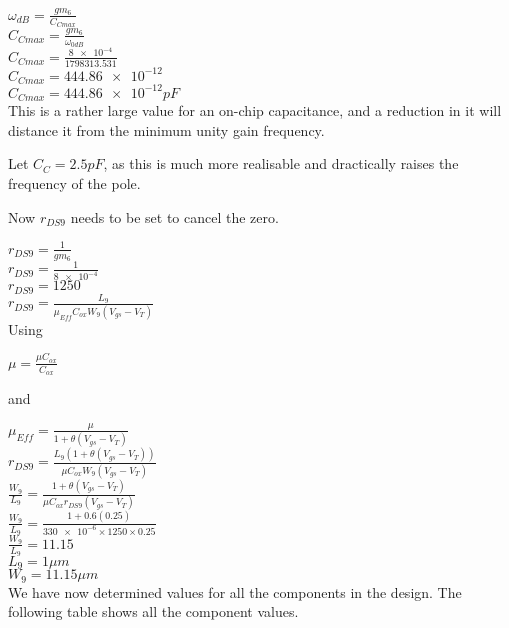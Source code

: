 $\omega_{dB} = \frac{gm_{6}}{C_{Cmax}}$ \\
$C_{Cmax} = \frac{gm_{6}}{\omega_{0dB}}$ \\
$C_{Cmax} = \frac{\num{8e-4}}{1798313.531}$ \\
$C_{Cmax} = \num{444.86e-12}$ \\
$C_{Cmax} = \num{444.86e-12}pF$ \\

This is a rather large value for an on-chip capacitance, and a reduction in it will distance it from the minimum unity gain frequency.

Let $C_{C} = 2.5pF$, as this is much more realisable and dractically raises the frequency of the pole.

Now $r_{DS9}$ needs to be set to cancel the zero.

$r_{DS9} = \frac{1}{gm_{6}}$ \\
$r_{DS9} = \frac{1}{\num{8e-4}}$ \\
$r_{DS9} = 1250$ \\

$r_{DS9} = \frac{L_{9}}{\mu_{Eff}C_{ox}W_{9}(V_{gs} - V_{T})}$ \\

Using

$\mu = \frac{\mu C_{ox}}{C_{ox}}$

and

$\mu_{Eff} = \frac{\mu}{1 + \theta (V_{gs} - V_{T})}$ \\

$r_{DS9} = \frac{L_{9}(1 + \theta (V_{gs} - V_{T}))}{\mu C_{ox}W_{9}(V_{gs} - V_{T})}$ \\
$\frac{W_{9}}{L_{9}} = \frac{1 + \theta (V_{gs} - V_{T})}{\mu C_{ox}r_{DS9}(V_{gs} - V_{T})}$ \\
$\frac{W_{9}}{L_{9}} = \frac{1 + 0.6(0.25)}{\num{330e-6} \times 1250 \times 0.25}$ \\
$\frac{W_{9}}{L_{9}} = 11.15$ \\

$L_{9} = 1\mu m$ \\
$W_{9} = 11.15\mu m$ \\

We have now determined values for all the components in the design.
The following table shows all the component values.

